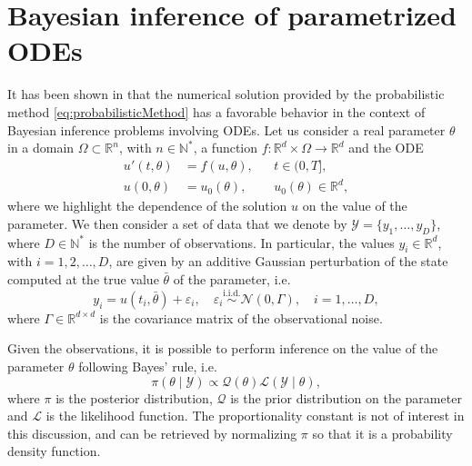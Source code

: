 \documentclass{siamart1116}
\numberwithin{theorem}{section}
\newcommand{\iid}{\ensuremath{\stackrel{\text{i.i.d.}}{\sim}}}
\newcommand{\N}{\mathbb{N}}
\newcommand{\R}{\mathbb{R}}
\newcommand{\epl}{\varepsilon}
\newcommand{\diffL}{\mathcal{L}}
\newcommand{\prior}{\mathcal{Q}}
\begin{document}
\section{Bayesian inference of parametrized ODEs}\label{sect:Bayes}

It has been shown in \cite{CGS16} that the numerical solution provided by the probabilistic method \eqref{eq:probabilisticMethod} has a favorable behavior in the context of Bayesian inference problems involving ODEs. Let us consider a real parameter $\theta$ in a domain $\Omega \subset \R^n$, with $n \in \N^*$, a function $f \colon \R^d\times \Omega \to\R^d$ and the ODE
\begin{equation}\label{eq:ParamODE}
\begin{aligned}
	u'(t, \theta) &= f(u, \theta), &&  t \in (0, T], \\
	u(0, \theta)  &= u_0(\theta), && u_0(\theta) \in \R^d,
\end{aligned}
\end{equation}
where we highlight the dependence of the solution $u$ on the value of the parameter. We then consider a set of data that we denote by $\mathcal{Y} = \{y_1, \ldots, y_D\}$, where $D \in \N^*$ is the number of observations. In particular, the values $y_i \in \R^d$, with $i = 1, 2, \ldots, D$, are given by an additive Gaussian perturbation of the state computed at the true value $\bar \theta$ of the parameter, i.e.
\begin{equation}
	y_i = u(t_i, \bar \theta) + \epl_i, \quad \epl_i \iid \mathcal{N}(0, \Gamma), \quad i = 1, \ldots, D,
\end{equation}
where $\Gamma \in \R^{d\times d}$ is the covariance matrix of the observational noise.

Given the observations, it is possible to perform inference on the value of the parameter $\theta$ following Bayes' rule, i.e.
\begin{equation}\label{eq:ExactPosterior}
	\pi(\theta\mid\mathcal Y) \propto \prior(\theta) \diffL(\mathcal Y\mid \theta),
\end{equation}
where $\pi$ is the posterior distribution, $\prior$ is the prior distribution on the parameter and $\diffL$ is the likelihood function. The proportionality constant is not of interest in this discussion, and can be retrieved by normalizing $\pi$ so that it is a probability density function. 
\end{document}

